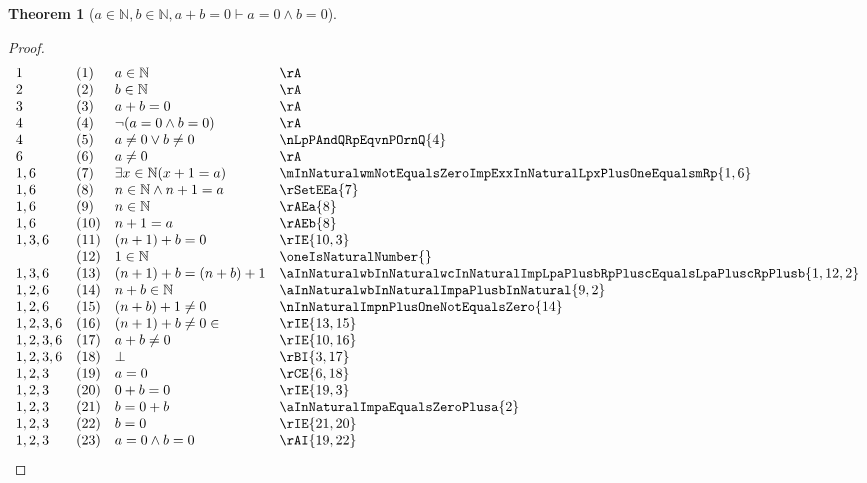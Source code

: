 \documentclass{book}
\theoremstyle{plain}
\newtheorem{theorem}{Theorem}
\theoremstyle{remark}
\theoremstyle{definition}
\begin{document}
\label{aInNaturalwbInNaturalwaPlusbEqualsZeroImpaEqualsZeroAndbEqualsZero}
\begin{theorem}[\(a\in\mathbb{N}, b\in\mathbb{N}, a+b=0\vdash a=0\land b=0\)]
\end{theorem}
\begin{proof}
        \[
	\begin{array}{llll}
            1       &  (1)  & a\in\mathbb{N} & \rA \\
            2       &  (2)  & b\in\mathbb{N} & \rA \\
            3       &  (3)  & a+b=0 & \rA \\
            4       &  (4)  & \neg(a=0\land b=0) & \rA \\
            4       &  (5)  & a\neq 0\lor b\neq 0 & \nLpPAndQRpEqvnPOrnQ{4} \\
            6       &  (6)  & a\neq 0 & \rA \\
            1,6     &  (7)  & \exists x\in\mathbb{N}(x+1=a) & \mInNaturalwmNotEqualsZeroImpExxInNaturalLpxPlusOneEqualsmRp{1,6} \\
            1,6     &  (8)  & n\in\mathbb{N}\land n+1=a & \rSetEEa{7} \\
            1,6     &  (9)  & n\in\mathbb{N} & \rAEa{8} \\
            1,6     &  (10) & n+1=a & \rAEb{8} \\
            1,3,6   &  (11) & (n+1)+b=0 & \rIE{10,3} \\
                    &  (12) & 1\in\mathbb{N} & \oneIsNaturalNumber{} \\
            1,3,6   &  (13) & (n+1)+b=(n+b)+1 & \aInNaturalwbInNaturalwcInNaturalImpLpaPlusbRpPluscEqualsLpaPluscRpPlusb{1,12,2} \\
            1,2,6   &  (14) & n+b\in\mathbb{N} & \aInNaturalwbInNaturalImpaPlusbInNatural{9,2} \\
            1,2,6   &  (15) & (n+b)+1\neq 0 & \nInNaturalImpnPlusOneNotEqualsZero{14} \\
            1,2,3,6 &  (16) & (n+1)+b\neq 0\in & \rIE{13,15} \\
            1,2,3,6 &  (17) & a+b\neq 0 & \rIE{10,16} \\
            1,2,3,6 &  (18) & \bot & \rBI{3,17} \\
            1,2,3   &  (19) & a=0 & \rCE{6,18} \\
            1,2,3   &  (20) & 0+b=0 & \rIE{19,3} \\
            1,2,3   &  (21) & b=0+b & \aInNaturalImpaEqualsZeroPlusa{2} \\
            1,2,3   &  (22) & b=0 & \rIE{21,20} \\
            1,2,3   &  (23) & a=0\land b=0 & \rAI{19,22} \\
	\end{array}
	\]
\end{proof}
\end{document}
